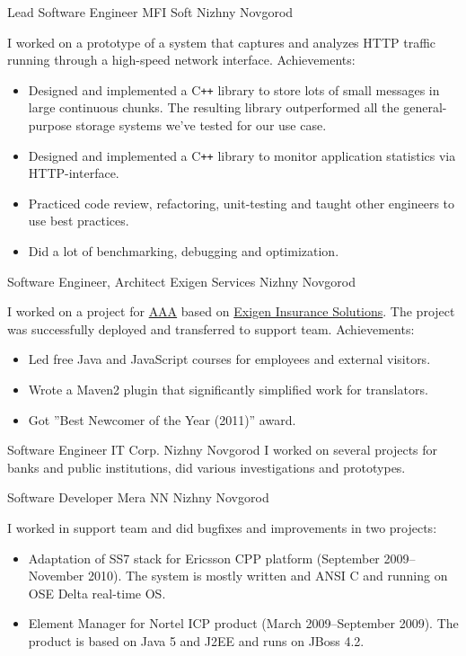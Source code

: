\documentclass[11pt,a4paper,sans]{moderncv}
\newcommand{\Cpp}{C{}\texttt{++}}
\begin{document}
{Lead Software Engineer}
{MFI Soft}
{Nizhny Novgorod}
{}
{I worked on a prototype of a system that captures and analyzes HTTP
traffic running through a high-speed network interface.
\newline{}
Achievements:
\begin{itemize}
\item Designed and implemented a \Cpp{} library to store lots of small
  messages in large continuous chunks. The resulting library
  outperformed all the general-purpose storage systems we've tested
  for our use case.
\item Designed and implemented a \Cpp{} library to monitor application
  statistics via HTTP-interface.
\item Practiced code review, refactoring, unit-testing and taught
  other engineers to use best practices.
\item Did a lot of benchmarking, debugging and optimization.
\end{itemize}
}

{Software Engineer, Architect}
{Exigen Services}
{Nizhny Novgorod}
{}
{I worked on a project for
\href{http://www.aaa.com/PPInternational/International.html}{AAA}
based on
\href{http://www.exigeninsurance.com/business-solutions/overview.html}{Exigen Insurance Solutions}.
The project was successfully deployed and transferred to support team.
\newline{}
Achievements:
\begin{itemize}
\item Led free Java and JavaScript courses for employees and external
  visitors.
\item Wrote a Maven2 plugin that significantly simplified work for
  translators.
\item Got ''Best Newcomer of the Year (2011)'' award.
\end{itemize}
}

{Software Engineer}
{IT Corp.}
{Nizhny Novgorod}
{}
{I worked on several projects for banks and public institutions, did
various investigations and prototypes.
}

{Software Developer}
{Mera NN}
{Nizhny Novgorod}
{}
{I worked in support team and did bugfixes and improvements in two
projects:
\begin{itemize}
\item Adaptation of SS7 stack for Ericsson CPP platform (September
  2009--November 2010).  The system is mostly written and ANSI C and
  running on OSE Delta real-time OS.
\item Element Manager for Nortel ICP product (March 2009--September
  2009).  The product is based on Java 5 and J2EE and runs on JBoss
  4.2.
\end{itemize}
}
\end{document}
